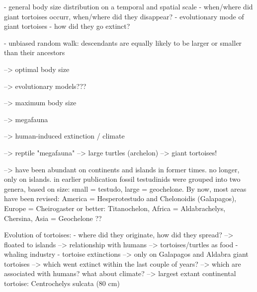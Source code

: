 - general body size distribution on a temporal and spatial scale
- when/where did giant tortoises occurr, when/where did they disappear?
- evolutionary mode of giant tortoises
- how did they go extinct?


- unbiased random walk: descendants are equally likely to be larger or smaller than their ancestors











































\vspace{3 cm}


--> optimal body size

--> evolutionary models???

--> maximum body size 

--> megafauna 

--> human-induced extinction / climate

--> reptile "megafauna" --> large turtles (archelon) --> giant tortoises!

--> have been abundant on continents and islands in former times. no longer, only on islands.
in earlier publication fossil testudinids were grouped into two genera, based on size: small = testudo, large = geochelone. 
By now, most areas have been revised: America = Hesperotestudo and Chelonoidis (Galapagos), Europe = Cheirogaster or better: Titanochelon, Africa = Aldabrachelys, Chersina, Asia = Geochelone ??

Evolution of tortoises:
- where did they originate, how did they spread?
--> floated to islands
--> relationship with humans --> tortoises/turtles as food - whaling industry
- tortoise extinctions --> only on Galapagos and Aldabra giant tortoises --> which went extinct within the last couple of years? --> which are associated with humans?
what about climate?
--> largest extant continental tortoise: Centrochelys sulcata (80 cm)





